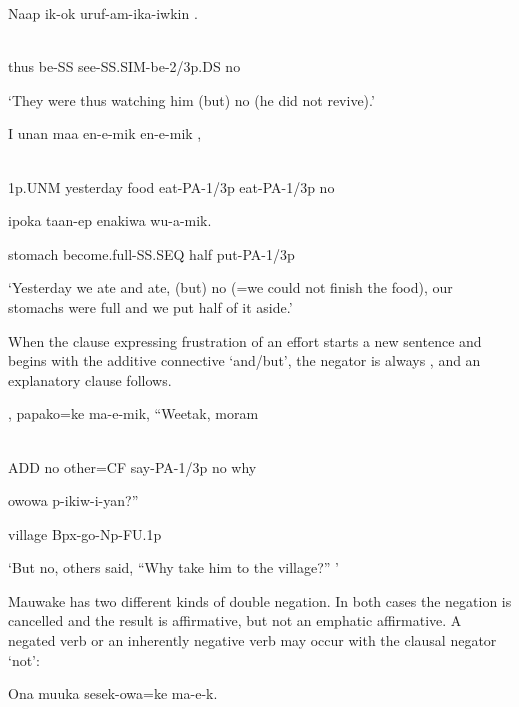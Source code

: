 \ea%
\label{ex:x1126}
\gll Naap  ik-ok  uruf-am-ika-iwkin  . \\
      \\
\glt
\z

thus  be-SS  see-SS.SIM-be-2/3p.DS  no

`They were thus watching him (but) no (he did not revive).'

\ea%
\label{ex:x1123}
\gll I  unan  maa  en-e-mik  en-e-mik  ,  \\
      \\
\glt
\z

1p.UNM  yesterday  food  eat-PA-1/3p  eat-PA-1/3p  no

ipoka  taan-ep  enakiwa  wu-a-mik.

stomach  become.full-SS.SEQ  half  put-PA-1/3p

`Yesterday we ate and ate, (but) no (=we could not finish the food), our stomachs were full and we put half of it aside.'

When the clause expressing frustration of an effort starts a new sentence and begins with the additive connective  `and/but', the negator is always , and an explanatory clause follows.

\ea%
\label{ex:x1125}
\gll {}  ,  papako=ke  ma-e-mik,  ``Weetak,  moram  \\
      \\
\glt
\z

ADD  no  other=CF  say-PA-1/3p  no  why

owowa  p-ikiw-i-yan?''

village  Bpx-go-Np-FU.1p

`But no, others said, ``Why take him to the village?'' '

Mauwake has two different kinds of double negation. In both cases the negation is cancelled and the result is affirmative, but not an emphatic affirmative. A negated verb or an inherently negative verb may occur with the clausal negator  `not':

\ea%
\label{ex:x1131}
\gll Ona  muuka    sesek-owa=ke    ma-e-k. \\
      \\
\glt
\z

